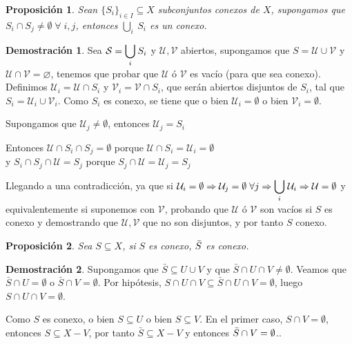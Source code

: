 \documentclass[12pt,twoside]{report}
\newcommand\mc[1]{\mathcal{#1}}
\theoremstyle{azul}
\theoremstyle{azul2}
\theoremstyle{plain}
\newtheorem*{prop}{Proposición}
\theoremstyle{definition}
\newtheorem*{dem}{Demostración}
\theoremstyle{remark}
\begin{document}
    
\begin{prop}
Sean $\{ S_i\}_{i \in I} \subseteq X$ subconjuntos conexos de $X$, supongamos que $S_i \cap S_j \neq \emptyset \; \forall \; i,j$, entonces $\displaystyle \underset{i}{\bigcup} \: S_i$ es un conexo.
\end{prop}
\begin{dem}
Sea $\mc{S}=\underset{i}{\mathlarger{\bigcup}} \: S_i$ y $\mc{U}, \mc{V}$ abiertos, supongamos que $S=\mc{U} \cup \mc{V}$ y \\ $\mc{U} \cap \mc{V} = \varnothing$, tenemos que probar que $\mc{U}$ ó $\mc{V}$ es vacío (para que sea conexo). Definimos $\mc{U}_i=\mc{U} \cap S_i$ y $\mc{V}_i=\mc{V} \cap S_i$, que serán abiertos disjuntos de $S_i$, tal que $S_i=\mc{U}_i \cup \mc{V}_i$. Como $S_i$ es conexo, se tiene que o bien $\mc{U}_i=\emptyset$ o bien $\mc{V}_i=\emptyset$.

 Supongamos que $\mc{U}_j \neq \emptyset$, entonces $\mc{U}_j = S_i$
    
Entonces $\mc{U} \cap S_i \cap S_j = \emptyset$ porque $\mc{U} \cap S_i = \mc{U}_i = \emptyset$\\ y $S_i \cap S_j \cap \mc{U} = S_j $ porque $S_j \cap \mc{U} = \mc{U}_j = S_j$
    
Llegando a una contradicción, ya que si $\mc{U}_i=\emptyset \Rightarrow \mc{U}_j = \emptyset \; \forall j \Rightarrow \underset{i}{\mathlarger{\bigcup}} \; \mc{U}_i \Rightarrow \mc{U}=\emptyset$ y equivalentemente si suponemos con $\mc{V}$, probando que $\mc{U}$ \'{o} $\mc{V}$ son vacíos si $S$ es conexo y demostrando que $\mc{U}, \mc{V}$ que no son disjuntos, y por tanto $S$ conexo. 
\end{dem}

\begin{prop}
Sea $S \subseteq X$, si $S$ es conexo, $\Bar{S}$ es conexo.
\end{prop}
    
\begin{dem}
Supongamos que $\bar{S} \subseteq U \cup V$ y que $\bar{S} \cap U \cap V \neq \emptyset$. Veamos que $\bar{S} \cap U = \emptyset$ o $\bar{S} \cap V = \emptyset$. Por hipótesis, $S \cap U \cap V \subseteq \bar{S} \cap U \cap V = \emptyset$, luego $S \cap U \cap V = \emptyset$. 

Como $ S$ es conexo, o bien $S \subseteq U$ o bien $S \subseteq V$. En el primer caso, $S \cap V = \emptyset$, entonces $S \subseteq X-V$, por tanto $\bar{S} \subseteq X-V$ y entonces $\Bar{S}\cap V = \emptyset$..
\end{dem}    
\end{document}
